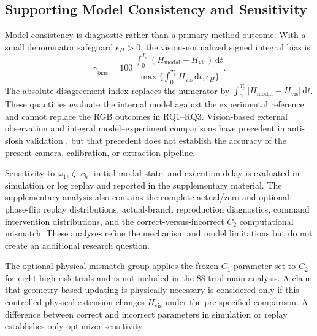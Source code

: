 \subsection{Supporting Model Consistency and Sensitivity}

Model consistency is diagnostic rather than a primary method outcome. With a
small denominator safeguard $\epsilon_H>0$, the vision-normalized signed
integral bias is
\begin{equation}
  \gamma_{\mathrm{bias}}
  =100\,
  \frac{\int_0^{T_e}(H_{\mathrm{modal}}-H_{\mathrm{vis}})\,\mathrm dt}
  {\max\{\int_0^{T_e}H_{\mathrm{vis}}\,\mathrm dt,\epsilon_H\}}.
  \label{eq:model_bias}
\end{equation}
The absolute-disagreement index replaces the numerator by
$\int_0^{T_e}|H_{\mathrm{modal}}-H_{\mathrm{vis}}|\,\mathrm dt$. These
quantities evaluate the internal model against the experimental reference and
cannot replace the RGB outcomes in RQ1--RQ3. Vision-based external observation
and integral model--experiment comparisons have precedent in anti-slosh
validation \cite{C01_Ferrari2026}, but that precedent does not establish the
accuracy of the present camera, calibration, or extraction pipeline.

Sensitivity to $\omega_1$, $\zeta$, $c_h$, initial modal state, and execution
delay is evaluated in simulation or log replay and reported in the
supplementary material. The supplementary analysis also contains the complete
actual/zero and optional phase-flip replay distributions, actual-branch
reproduction diagnostics, command intervention distributions, and the
correct-versus-incorrect $C_2$ computational mismatch. These analyses refine
the mechanism and model limitations but do not create an additional research
question.

The optional physical mismatch group applies the frozen $C_1$ parameter set to
$C_2$ for eight high-risk \SMPCC{} trials and is not included in the 88-trial
main analysis. A claim that geometry-based updating is physically necessary is
considered only if this controlled physical extension changes
$H_{\mathrm{vis}}$ under the pre-specified comparison. A difference between
correct and incorrect parameters in simulation or replay establishes only
optimizer sensitivity.


\FloatBarrier
